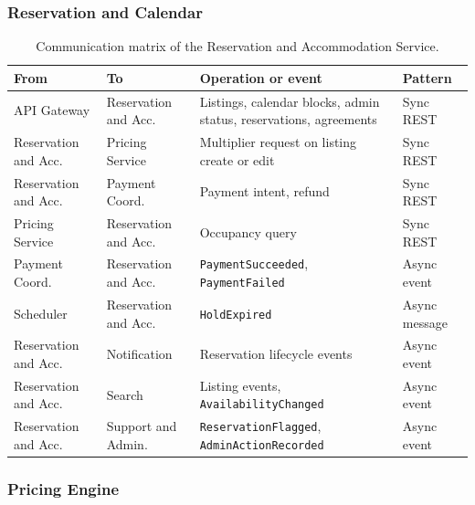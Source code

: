 \subsubsection{Reservation and Calendar}
\begin{table}[!ht]
  \centering
  \small
  \begin{tabularx}{\textwidth}{@{}>{\raggedright\arraybackslash}p{2.8cm}>{\raggedright\arraybackslash}p{2.8cm}>{\raggedright\arraybackslash}X>{\raggedright\arraybackslash}p{2.0cm}@{}}
    \toprule
    \textbf{From} & \textbf{To} & \textbf{Operation or event} & \textbf{Pattern} \\
    \midrule
    API Gateway & Reservation and Acc. & Listings, calendar blocks, admin status, reservations, agreements & Sync REST \\
    Reservation and Acc. & Pricing Service & Multiplier request on listing create or edit & Sync REST \\
    Reservation and Acc. & Payment Coord. & Payment intent, refund & Sync REST \\
    Pricing Service & Reservation and Acc. & Occupancy query & Sync REST \\
    Payment Coord. & Reservation and Acc. & \texttt{PaymentSucceeded}, \texttt{PaymentFailed} & Async event \\
    Scheduler & Reservation and Acc. & \texttt{HoldExpired} & Async message \\
    Reservation and Acc. & Notification & Reservation lifecycle events & Async event \\
    Reservation and Acc. & Search & Listing events, \texttt{AvailabilityChanged} & Async event \\
    Reservation and Acc. & Support and Admin. & \texttt{ReservationFlagged}, \texttt{AdminActionRecorded} & Async event \\
    \bottomrule
  \end{tabularx}
  \caption{Communication matrix of the Reservation and Accommodation Service.}
\end{table}

\begingroup
\setlength{\emergencystretch}{3em}
\subsubsection{Pricing Engine}
\label{sec:price-matrix}

